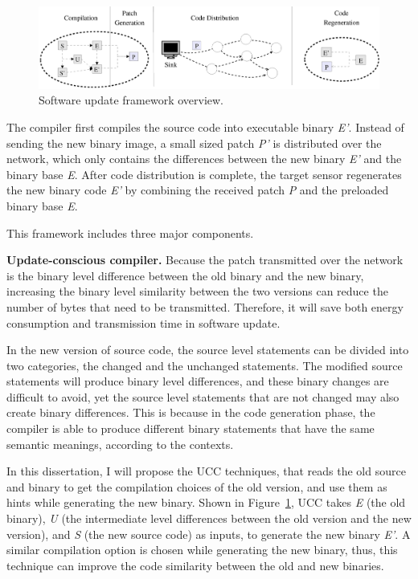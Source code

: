 \begin{figure}[htbp]
	\centering
		\includegraphics[scale=0.45]{figures/model.eps}
	\caption{Software update framework overview.}
	\label{fig:overview}
\end{figure}


The compiler first compiles the source code into executable binary {\it E'}. 
Instead of sending the new binary image, a small sized patch {\it P'} is distributed over the network, which only contains the differences between the new binary {\it E'} and the binary base {\it E}.  After code distribution is complete, the target sensor regenerates the new binary code {\it E'} by combining the received patch {\it P} and the preloaded binary base {\it E}. 

This framework includes three major components.

\textbf{Update-conscious compiler.} 
Because the patch transmitted over the network is the binary level difference between the old binary and the new  binary, increasing the binary level similarity between the two versions can reduce the number of bytes that need to be transmitted. Therefore, it will save both energy consumption and transmission time in software update. 


In the new version of source code, the source level statements can be divided into two categories, the changed and the unchanged statements.  The modified source statements will produce binary level differences, and these binary changes are difficult to avoid, yet the source level statements that are not changed may also create binary differences.
This is because in the code generation phase, the compiler is able to produce different binary statements that have the same semantic meanings, according to the contexts.

In this dissertation, I will propose the UCC techniques, that reads the old source and binary to get the compilation choices of the old version, and use them as hints while generating the new binary. 
Shown in Figure~\ref{fig:overview}, UCC takes {\it E} (the old binary), {\it U} (the intermediate level differences between the old version and the new version), and {\it S} (the new source code) as inputs, to generate the new binary {\it E'}. A similar compilation option is chosen while generating the new binary, thus, this technique can improve the code similarity between the old and new binaries.

